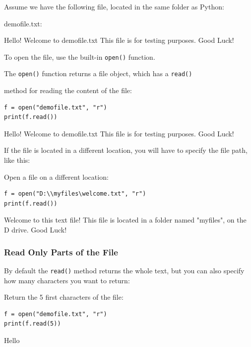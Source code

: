 \documentclass[12pt,a4paper]{article}
\newcommand{\code}[1]{%
	\colorbox{backcolour}{\lstinline{#1}}%
}
\begin{document}
Assume we have the following file, located in the same folder as Python:

\begin{bbox}
demofile.txt:
\begin{vercode}
Hello! Welcome to demofile.txt
This file is for testing purposes.
Good Luck!
\end{vercode}
\end{bbox}

To open the file, use the built-in \code{open()} function.

The \code{open()} function returns a file object, which has a \code{read()}
method for reading the content of the file:

\begin{ebox}
	\begin{lstlisting}
f = open("demofile.txt", "r")
print(f.read())
	\end{lstlisting}
\tcblower
	\begin{vercode}
Hello! Welcome to demofile.txt
This file is for testing purposes.
Good Luck!
	\end{vercode}
\end{ebox}

If the file is located in a different location, you will have to specify the file path, like this:

\begin{ebox}
Open a file on a different location:
	\begin{lstlisting}
f = open("D:\\myfiles\welcome.txt", "r")
print(f.read())
	\end{lstlisting}
\tcblower
	\begin{vercode}
Welcome to this text file!
This file is located in a folder named "myfiles", on the D drive.
Good Luck!
	\end{vercode}
\end{ebox}

\subsubsection{Read Only Parts of the File}

By default the \code{read()} method returns the whole text, but you can also
specify how many characters you want to return:

\begin{ebox}
Return the 5 first characters of the file:
	\begin{lstlisting}
f = open("demofile.txt", "r")
print(f.read(5))
	\end{lstlisting}
\tcblower
	\begin{vercode}
Hello
	\end{vercode}
\end{ebox}
\end{document}
